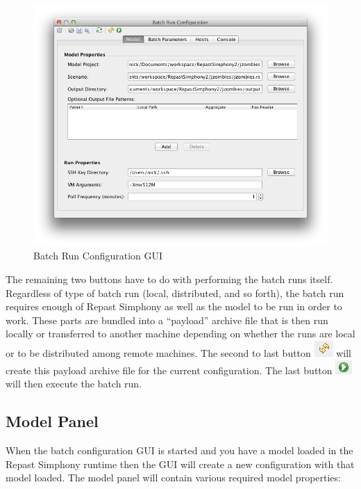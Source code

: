 \documentclass[11pt]{amsart}
\begin{document}
\begin{figure}[h]
\begin{center}
\vspace{.2in}
\centerline {
\includegraphics[width=6.5in]{images/config_gui.png}
}
\caption{Batch Run Configuration GUI}
\label{fig:config_gui}
\end{center}
\end{figure}


The remaining two buttons have to do with performing the batch runs itself. Regardless of type of batch run (local, distributed, and so forth), the batch run requires enough of Repast Simphony as well as the model to be run in order to work. These parts are bundled into a ``payload'' archive file that is then run locally or transferred to another machine depending on whether the runs are local or to be distributed among remote machines. The second to last button \includegraphics[height=.2in]{images/create_archive_button.png} will create this payload archive file for the current configuration. The last button  \includegraphics[height=.2in]{images/run_button.png} will then execute the batch run.

\subsection{Model Panel}
When the batch configuration GUI is started and you have a model loaded in the Repast Simphony runtime then the GUI will create a new configuration with that model loaded. The model panel will contain various required model properties:
\end{document}
